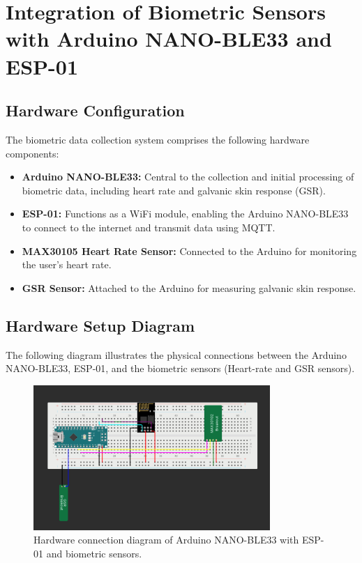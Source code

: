 \documentclass{article}
\begin{document}
\section{Integration of Biometric Sensors with Arduino NANO-BLE33 and ESP-01}

\subsection{Hardware Configuration}
The biometric data collection system comprises the following hardware components:
\begin{itemize}
    \item \textbf{Arduino NANO-BLE33:} Central to the collection and initial processing of biometric data, including heart rate and galvanic skin response (GSR).
    \item \textbf{ESP-01:} Functions as a WiFi module, enabling the Arduino NANO-BLE33 to connect to the internet and transmit data using MQTT.
    \item \textbf{MAX30105 Heart Rate Sensor:} Connected to the Arduino for monitoring the user's heart rate.
    \item \textbf{GSR Sensor:} Attached to the Arduino for measuring galvanic skin response.
\end{itemize}
\subsection{Hardware Setup Diagram}
The following diagram illustrates the physical connections between the Arduino NANO-BLE33, ESP-01, and the biometric sensors (Heart-rate and GSR sensors).

\begin{figure}[h]
    \centering
    \includegraphics[width=0.8\textwidth]{../images/gsr&heart.png}
    \caption{Hardware connection diagram of Arduino NANO-BLE33 with ESP-01 and biometric sensors.}
    \label{fig:hardware-setup}
\end{figure}
\end{document}
